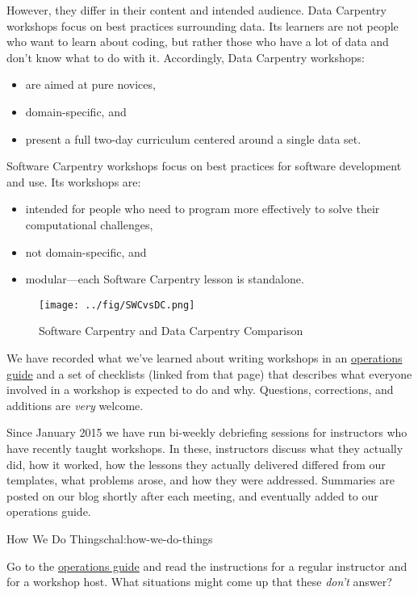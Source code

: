 However, they differ in their content and intended audience. Data
Carpentry workshops focus on best practices surrounding data. Its
learners are not people who want to learn about coding, but rather those
who have a lot of data and don't know what to do with it. Accordingly,
Data Carpentry workshops:

\begin{itemize}
\item
  are aimed at pure novices,
\item
  domain-specific, and
\item
  present a full two-day curriculum centered around a single data set.
\end{itemize}

Software Carpentry workshops focus on best practices for software
development and use. Its workshops are:

\begin{itemize}
\item
  intended for people who need to program more effectively to solve
  their computational challenges,
\item
  not domain-specific, and
\item
  modular---each Software Carpentry lesson is standalone.
\end{itemize}

\begin{figure}[htbp]
\centering
\texttt{[image: ../fig/SWCvsDC.png]}
\caption{Software Carpentry and Data Carpentry Comparison}
\end{figure}


We have recorded what we've learned about writing workshops in an
\href{http://software-carpentry.org/workshops/operations/}{operations
guide} and a set of checklists (linked from that page) that describes
what everyone involved in a workshop is expected to do and why.
Questions, corrections, and additions are \emph{very} welcome.

Since January 2015 we have run bi-weekly debriefing sessions for
instructors who have recently taught workshops. In these, instructors
discuss what they actually did, how it worked, how the lessons they
actually delivered differed from our templates, what problems arose, and
how they were addressed. Summaries are posted on our blog shortly after
each meeting, and eventually added to our operations guide.

\begin{challenge}{How We Do Things}{chal:how-we-do-things}

Go to the
\href{http://software-carpentry.org/workshops/operations/}{operations
guide} and read the instructions for a regular instructor and for a
workshop host. What situations might come up that these \emph{don't}
answer?
\end{challenge}

